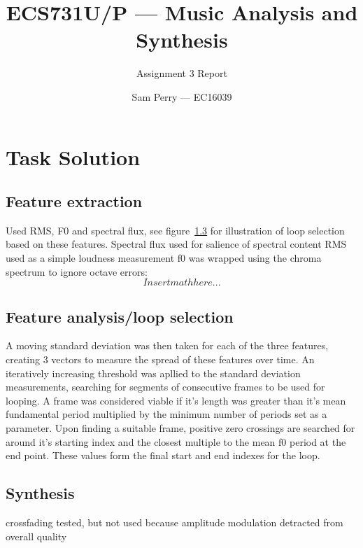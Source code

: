 \documentclass[titlepage]{scrartcl}
\begin{document}
\title{ECS731U/P --- Music Analysis and Synthesis}
\subtitle{\LARGE{Assignment 3 Report}}
\author{Sam Perry --- EC16039}

\maketitle

\section{Task Solution}
\subsection{Feature extraction}
Used RMS, F0 and spectral flux, see figure~\ref{} for illustration of loop
selection based on these features.
Spectral flux used for salience of spectral content
RMS used as a simple loudness measurement
f0 was wrapped using the chroma spectrum to ignore octave errors:
$$ Insert math here...$$
\subsection{Feature analysis/loop selection}
A moving standard deviation was then taken for each of the three features,
creating 3 vectors to measure the spread of these features over time.
An iteratively increasing threshold was apllied to the standard deviation
measurements, searching for segments of consecutive frames to be used for
looping. A frame was considered viable if it's length was greater than it's
mean fundamental period multiplied by the minimum number of periods set as a
parameter. 
Upon finding a suitable frame, positive zero crossings are searched for around
it's starting index and the closest multiple to the mean f0 period at the end
point. These values form the final start and end indexes for the loop.
\subsection{Synthesis}
crossfading tested, but not used because amplitude modulation detracted from
overall quality
\end{document}
